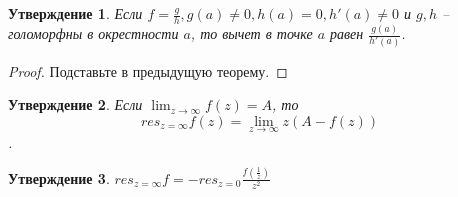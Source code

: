 \documentclass[12pt, letterpaper]{article}
\newtheorem{prop}{Утверждение}[section]
\begin{document}
\begin{prop}
Если $f=\frac{g}{h}, g(a)\neq 0, h(a)=0, h'(a) \neq 0$ и $g,h$ -- голоморфны в окрестности $a$, то вычет в точке $a$ равен $\frac{g(a)}{h'(a)}$.
\end{prop}

\begin{proof}
Подставьте в предыдущую теорему.
\end{proof}

\begin{prop}
Если $\lim_{z\rightarrow \infty} f(z) = A$, то $$res_{z=\infty} f(z) = \lim_{z\rightarrow \infty} z(A-f(z))$$.
\end{prop}

\begin{prop}
$res_{z=\infty} f = -res_{z=0}\frac{f(\frac1{z})}{z^2}$
\end{prop}
\end{document}
